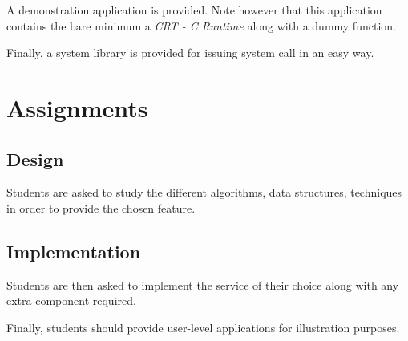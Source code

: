 A demonstration application is provided. Note however that this application
contains the bare minimum \ie{} a \textit{CRT - C Runtime} along with a
dummy function.

Finally, a system library is provided for issuing system call in
an easy way.

%
%

\section{Assignments}


\subsection*{Design}

Students are asked to study the different algorithms, data structures,
techniques in order to provide the chosen feature.


\subsection*{Implementation}

Students are then asked to implement the service of their choice
along with any extra component required.

Finally, students should provide user-level applications for illustration
purposes.

